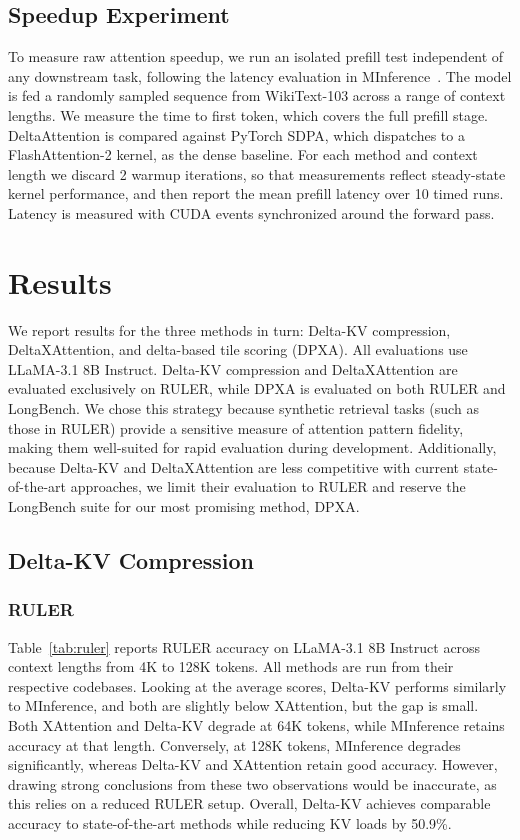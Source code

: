 \subsection{Speedup Experiment}

To measure raw attention speedup, we run an isolated prefill test independent of any downstream task, following the latency evaluation in MInference~\cite{jiang2024minference}. The model is fed a randomly sampled sequence from WikiText-103 across a range of context lengths. We measure the time to first token, which covers the full prefill stage. DeltaAttention is compared against PyTorch SDPA, which dispatches to a FlashAttention-2 kernel, as the dense baseline. For each method and context length we discard 2 warmup iterations, so that measurements reflect steady-state kernel performance, and then report the mean prefill latency over 10 timed runs. Latency is measured with CUDA events synchronized around the forward pass.

\section{Results}

We report results for the three methods in turn: Delta-KV compression, DeltaXAttention, and delta-based tile scoring (DPXA). All evaluations use LLaMA-3.1 8B Instruct. Delta-KV compression and DeltaXAttention are evaluated exclusively on RULER, while DPXA is evaluated on both RULER and LongBench. We chose this strategy because synthetic retrieval tasks (such as those in RULER) provide a sensitive measure of attention pattern fidelity, making them well-suited for rapid evaluation during development. Additionally, because Delta-KV and DeltaXAttention are less competitive with current state-of-the-art approaches, we limit their evaluation to RULER and reserve the LongBench suite for our most promising method, DPXA.

\subsection{Delta-KV Compression}

\subsubsection{RULER}

Table~\ref{tab:ruler} reports RULER accuracy on LLaMA-3.1 8B Instruct across context lengths from 4K to 128K tokens. All methods are run from their respective codebases. Looking at the average scores, Delta-KV performs similarly to MInference, and both are slightly below XAttention, but the gap is small. Both XAttention and Delta-KV degrade at 64K tokens, while MInference retains accuracy at that length. Conversely, at 128K tokens, MInference degrades significantly, whereas Delta-KV and XAttention retain good accuracy. However, drawing strong conclusions from these two observations would be inaccurate, as this relies on a reduced RULER setup. Overall, Delta-KV achieves comparable accuracy to state-of-the-art methods while reducing KV loads by 50.9\%.

